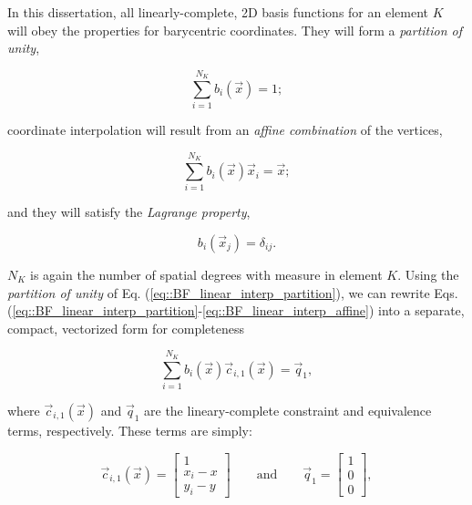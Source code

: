 In this dissertation, all linearly-complete, 2D basis functions for an element $K$ will obey the properties for barycentric coordinates. They will form a {\em partition of unity},

\begin{equation}
\sum_{i=1}^{N_K} b_i (\vec{x})  =  1;
\label{eq::BF_linear_interp_partition}
\end{equation}

\noindent coordinate interpolation will result from an {\em affine combination} of the vertices,

\begin{equation}
\sum_{i=1}^{N_K} b_i(\vec{x}) \vec{x}_i  =  \vec{x};
\label{eq::BF_linear_interp_affine}
\end{equation}

\noindent and they will satisfy the {\em Lagrange property},

\begin{equation}
b_i (\vec{x}_j) = \delta_{ij}.
\label{eq::BF_linear_interp_lagrange}
\end{equation}

\noindent $N_K$ is again the number of spatial degrees with measure in element $K$. Using the {\em partition of unity} of Eq. (\ref{eq::BF_linear_interp_partition}), we can rewrite Eqs. (\ref{eq::BF_linear_interp_partition}-\ref{eq::BF_linear_interp_affine}) into a separate, compact, vectorized form for completeness

\begin{equation}
\sum_{i=1}^{N_K}  b_i (\vec{x}) \vec{c}_{i,1}(\vec{x}) = \vec{q}_1 ,
\label{eq::BF_linear_interp_req_vector}
\end{equation}

\noindent where $\vec{c}_{i,1}(\vec{x})$ and $\vec{q}_1$ are the lineary-complete constraint and equivalence terms, respectively. These terms are simply:

\begin{equation}
\vec{c}_{i,1}(\vec{x}) = \left[
\begin{array}{c}
1 \\
x_i - x \\
y_i - y
\end{array} \right]
  \qquad \text{and} \qquad \vec{q}_1 = \left[
\begin{array}{c}
1 \\
0 \\
0
\end{array} \right],
\label{eq::BF_linear_constraint_terms}
\end{equation}

